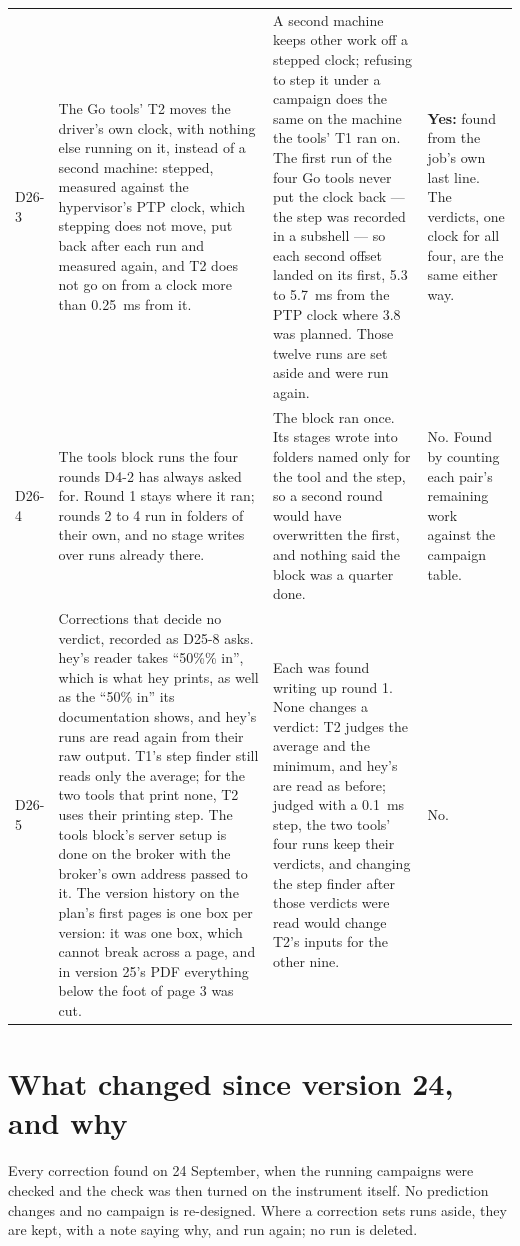\documentclass[11pt]{article}
\begin{document}
{\begin{longtable}{@{}p{1.1cm} >{\raggedright\arraybackslash}p{6.1cm} >{\raggedright\arraybackslash}p{6.0cm} >{\raggedright\arraybackslash}p{2.2cm}@{}}
D26-3 & The Go tools' T2 moves the driver's own clock, with nothing else running on it, instead of a second machine: stepped, measured against the hypervisor's PTP clock, which stepping does not move, put back after each run and measured again, and T2 does not go on from a clock more than 0.25~ms from it. & A second machine keeps other work off a stepped clock; refusing to step it under a campaign does the same on the machine the tools' T1 ran on. The first run of the four Go tools never put the clock back --- the step was recorded in a subshell --- so each second offset landed on its first, 5.3 to 5.7~ms from the PTP clock where 3.8 was planned. Those twelve runs are set aside and were run again. & \textbf{Yes:} found from the job's own last line. The verdicts, one clock for all four, are the same either way. \\
D26-4 & The tools block runs the four rounds D4-2 has always asked for. Round 1 stays where it ran; rounds 2 to 4 run in folders of their own, and no stage writes over runs already there. & The block ran once. Its stages wrote into folders named only for the tool and the step, so a second round would have overwritten the first, and nothing said the block was a quarter done. & No. Found by counting each pair's remaining work against the campaign table. \\
D26-5 & Corrections that decide no verdict, recorded as D25-8 asks. hey's reader takes ``50\%\% in'', which is what hey prints, as well as the ``50\% in'' its documentation shows, and hey's runs are read again from their raw output. T1's step finder still reads only the average; for the two tools that print none, T2 uses their printing step. The tools block's server setup is done on the broker with the broker's own address passed to it. The version history on the plan's first pages is one box per version: it was one box, which cannot break across a page, and in version 25's PDF everything below the foot of page 3 was cut. & Each was found writing up round 1. None changes a verdict: T2 judges the average and the minimum, and hey's are read as before; judged with a 0.1~ms step, the two tools' four runs keep their verdicts, and changing the step finder after those verdicts were read would change T2's inputs for the other nine. & No. \\
\bottomrule
\end{longtable}}

\section*{What changed since version 24, and why}
Every correction found on 24 September, when the running campaigns were checked and the check
was then turned on the instrument itself. No prediction changes and no campaign is re-designed.
Where a correction sets runs aside, they are kept, with a note saying why, and run again; no
run is deleted.
\end{document}
